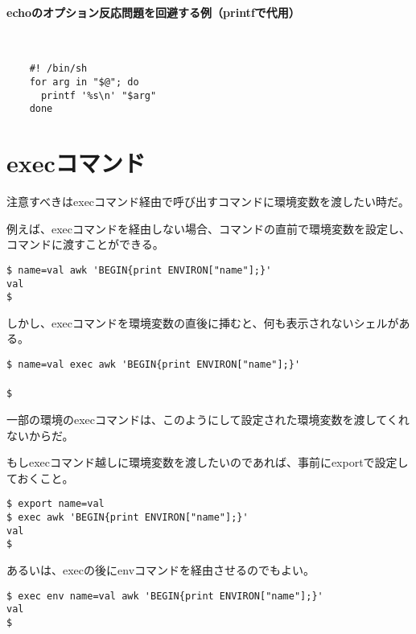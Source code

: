 \paragraph{echoのオプション反応問題を回避する例（printfで代用）} 　\\
\begin{frameboxit}{160.0mm}
\begin{verbatim}
	#! /bin/sh
	for arg in "$@"; do
	  printf '%s\n' "$arg"
	done
\end{verbatim}
\end{frameboxit}

\section{execコマンド}

注意すべきはexecコマンド経由で呼び出すコマンドに環境変数を渡したい時だ。

例えば、execコマンドを経由しない場合、コマンドの直前で環境変数を設定し、コマンドに渡すことができる。

\begin{screen}
	\verb|$ name=val awk 'BEGIN{print ENVIRON["name"];}'| \return \\
	\verb|val| \\
	\verb|$ |
\end{screen}

しかし、execコマンドを環境変数の直後に挿むと、何も表示されないシェルがある。

\begin{screen}
	\verb|$ name=val exec awk 'BEGIN{print ENVIRON["name"];}'| \return \\
	\verb|| \\
	\verb|$ |
\end{screen}

一部の環境のexecコマンドは、このようにして設定された環境変数を渡してくれないからだ。

もしexecコマンド越しに環境変数を渡したいのであれば、事前にexportで設定しておくこと。

\begin{screen}
	\verb|$ export name=val| \return \\
	\verb|$ exec awk 'BEGIN{print ENVIRON["name"];}'| \return \\
	\verb|val| \\
	\verb|$ |
\end{screen}

あるいは、execの後にenvコマンドを経由させるのでもよい。

\begin{screen}
	\verb|$ exec env name=val awk 'BEGIN{print ENVIRON["name"];}'| \return \\
	\verb|val| \\
	\verb|$ |
\end{screen}

